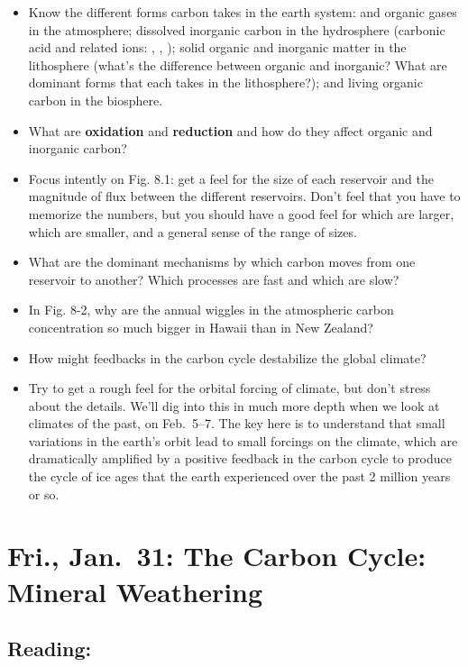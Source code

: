 \documentclass[
]{article}
\providecommand{\tightlist}{%
  \setlength{\itemsep}{0pt}\setlength{\parskip}{0pt}}
\newcommand{\COO}{\ce{CO2}}
\newcommand{\carbonic}{\ce{H2CO3}}
\newcommand{\carbonicacid}{\carbonic}
\newcommand{\carb}{\ce{CO3^2-}}
\newcommand{\bicarb}{\ce{HCO3-}}
\newcommand{\bicarbonate}{\bicarb}
\newcommand{\carbonate}{\carb}
\begin{document}
\begin{itemize}
\tightlist
\item
  Know the different forms carbon takes in the earth system: \COO{} and
  organic gases in the atmosphere; dissolved inorganic carbon in the
  hydrosphere (carbonic acid and related ions: \carbonicacid{},
  \bicarbonate{}, \carbonate{}); solid organic and inorganic matter in
  the lithosphere (what's the difference between organic and inorganic?
  What are dominant forms that each takes in the lithosphere?); and
  living organic carbon in the biosphere.
\item
  What are \textbf{oxidation} and \textbf{reduction} and how do they
  affect organic and inorganic carbon?
\item
  Focus intently on Fig. 8.1: get a feel for the size of each reservoir
  and the magnitude of flux between the different reservoirs. Don't feel
  that you have to memorize the numbers, but you should have a good feel
  for which are larger, which are smaller, and a general sense of the
  range of sizes.
\item
  What are the dominant mechanisms by which carbon moves from one
  reservoir to another? Which processes are fast and which are slow?
\item
  In Fig. 8-2, why are the annual wiggles in the atmospheric carbon
  concentration so much bigger in Hawaii than in New Zealand?
\item
  How might feedbacks in the carbon cycle destabilize the global
  climate?
\item
  Try to get a rough feel for the orbital forcing of climate, but don't
  stress about the details. We'll dig into this in much more depth when
  we look at climates of the past, on Feb.~5--7. The key here is to
  understand that small variations in the earth's orbit lead to small
  forcings on the climate, which are dramatically amplified by a
  positive feedback in the carbon cycle to produce the cycle of ice ages
  that the earth experienced over the past 2 million years or so.
\end{itemize}

\hypertarget{fri.-jan.-31-the-carbon-cycle-mineral-weathering}{%
\section{Fri., Jan.~31: The Carbon Cycle: Mineral
Weathering}\label{fri.-jan.-31-the-carbon-cycle-mineral-weathering}}

\hypertarget{reading-10}{%
\subsection{Reading:}\label{reading-10}}
\end{document}
